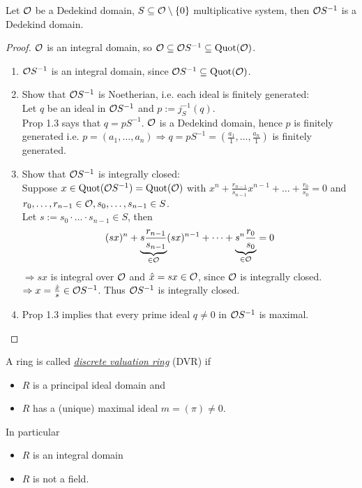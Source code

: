 \begin{Prop}
Let $\mathcal{O}$ be a Dedekind domain, $S \subseteq \mathcal{O}\setminus \{0\}$ multiplicative system, then $\mathcal{O} S^{-1}$ is a Dedekind domain.
\end{Prop}

\begin{proof}
$\mathcal{O}$ is an integral domain, so $\mathcal{O} \subseteq \mathcal{O} S^{-1} \subseteq \operatorname{Quot}(\mathcal{O})$.
\begin{enumerate}[(1)]
\item $\mathcal{O} S^{-1}$ is an integral domain, since $\mathcal{O} S^{-1} \subseteq \operatorname{Quot}(\mathcal{O})$.
\item Show that $\mathcal{O} S^{-1}$ is Noetherian, i.e. each ideal is finitely generated:\\
Let $q$ be an ideal in $\mathcal{O} S^{-1}$ and $p:=j_S^{-1}(q)$.\\
Prop 1.3 says that $q=pS^{-1}$. $\mathcal{O}$ is a Dedekind domain, hence $p$ is finitely generated i.e. $p=(a_1, \dots, a_n) \Rightarrow q=pS^{-1}=(\frac{a_1}{1}, \dots, \frac{a_n}{1})$ is finitely generated.
\item Show that $\mathcal{O} S^{-1}$ is integrally closed:\\
Suppose $x \in \operatorname{Quot}(\mathcal{O} S^{-1})=\operatorname{Quot}(\mathcal{O})$ with $x^n+\frac{r_{n-1}}{s_{n-1}} x^{n-1}+\dots+\frac{r_0}{s_0}=0$ and $r_0, \dots, r_{n-1} \in \mathcal{O}, s_0, \dots, s_{n-1} \in S$.\\
Let $s:=s_0 \cdot \ldots \cdot s_{n-1} \in S$, then
\[(sx)^n + \underbrace{s\frac{r_{n-1}}{s_{n-1}}}_{\in \mathcal{O}} (sx)^{n-1} + \dots + \underbrace{s^n \frac{r_0}{s_0}}_{\in \mathcal{O}} =0\]
$\Rightarrow sx$ is integral over $\mathcal{O}$ and $\hat x = sx \in \mathcal{O}$, since $\mathcal{O}$ is integrally closed.\\
$\Rightarrow x = \frac{\hat x}{s} \in \mathcal{O} S^{-1}$. Thus $\mathcal{O} S^{-1}$ is integrally closed.
\item Prop 1.3 implies that every prime ideal $q \not= 0$ in $\mathcal{O} S^{-1}$ is maximal.
\end{enumerate}
\end{proof}

\begin{defi}
A ring is called \emph{\underline{discrete valuation ring}} (DVR) if
\begin{itemize}
\item $R$ is a principal ideal domain and
\item $R$ has a (unique) maximal ideal $m=(\pi)\not = 0$.
\end{itemize}
In particular
\begin{itemize}
\item $R$ is an integral domain
\item $R$ is not a field.
\end{itemize}
\end{defi}